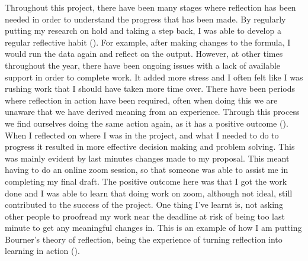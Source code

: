 Throughout this project, there have been many stages where reflection has been needed in order to understand the progress that has been made. By regularly putting my research on hold and taking a step back, I was able to develop a regular reflective habit  (\cite{dyment2010quality}). For example, after making changes to the formula, I would run the data again and reflect on the output. However, at other times throughout the year, there have been ongoing issues with a lack of available support in order to complete work. It added more stress and I often felt like I was rushing work that I should have taken more time over. There have been periods where reflection in action have been required, often when doing this we are unaware that we have derived meaning from an experience. Through this process we find ourselves doing the same action again, as it has a positive outcome (\cite{Schon83}). When I reflected on where I was in the project, and what I needed to do to progress it resulted in more effective decision making and problem solving. This was mainly evident by last minutes changes made to my proposal. This meant having to do an online zoom session, so that someone was able to assist me in completing my final draft. The positive outcome here was that I got the work done and I was able to learn that doing work on zoom, although not ideal, still contributed to the success of the project. One thing I've learnt is, not asking other people to proofread my work near the deadline at risk of being too last minute to get any meaningful changes in. This is an example of how I am putting Bourner's theory of reflection, being the experience of turning reflection into learning in action (\cite{bourner2003assessing}).

 




